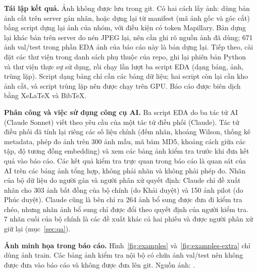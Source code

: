 \textbf{Tái lập kết quả.} Ảnh không được lưu trong git. Có hai cách lấy ảnh: dùng bản ảnh cắt trên server gán nhãn, hoặc dựng lại từ manifest (mã ảnh gốc và góc cắt) bằng script dựng lại ảnh của nhóm, với điều kiện có token Mapillary. Bản dựng lại khác bản trên server do nén JPEG lại, nên cần ghi rõ nguồn ảnh đã dùng; 671 ảnh val/test trong phần EDA ảnh của báo cáo này là bản dựng lại. Tiếp theo, cài đặt các thư viện trong danh sách phụ thuộc của repo, ghi lại phiên bản Python và thư viện thực sự sử dụng, rồi chạy lần lượt ba script EDA (dạng bảng, ảnh, trùng lặp). Script dạng bảng chỉ cần các bảng dữ liệu; hai script còn lại cần kho ảnh cắt, và script trùng lặp nên được chạy trên GPU. Báo cáo được biên dịch bằng XeLaTeX và BibTeX.

\textbf{Phân công và việc sử dụng công cụ AI.} Ba script EDA do ba tác tử AI (Claude Sonnet) viết theo yêu cầu của một tác tử điều phối (Claude). Tác tử điều phối đã tính lại riêng các số liệu chính (đếm nhãn, khoảng Wilson, thống kê metadata, phép đo ảnh trên 300 ảnh mẫu, mã băm MD5, khoảng cách giữa các tập, độ tương đồng embedding) và xem các bảng ảnh kiểm tra trước khi đưa kết quả vào báo cáo. Các kết quả kiểm tra trực quan trong báo cáo là quan sát của AI trên các bảng ảnh tổng hợp, không phải nhãn và không phải phép đo. Nhãn của bộ dữ liệu do người gán và người phân xử quyết định: Claude chỉ đề xuất nhãn cho 303 ảnh bất đồng của bộ chính (do Khải duyệt) và 150 ảnh pilot (do Phúc duyệt). Claude cũng là bên chỉ ra 264 ảnh bổ sung được đưa đi kiểm tra chéo, nhưng nhãn ảnh bổ sung chỉ được đổi theo quyết định của người kiểm tra. 7 nhãn cuối của bộ chính là các đề xuất khác cả hai phiếu và được người phân xử giữ lại (mục~\ref{sec:qa}).

\textbf{Ảnh minh họa trong báo cáo.} Hình~\ref{fig:examples} và~\ref{fig:examples-extra} chỉ dùng ảnh train. Các bảng ảnh kiểm tra nội bộ có chứa ảnh val/test nên không được đưa vào báo cáo và không được đưa lên git. Nguồn ảnh: \cc.
